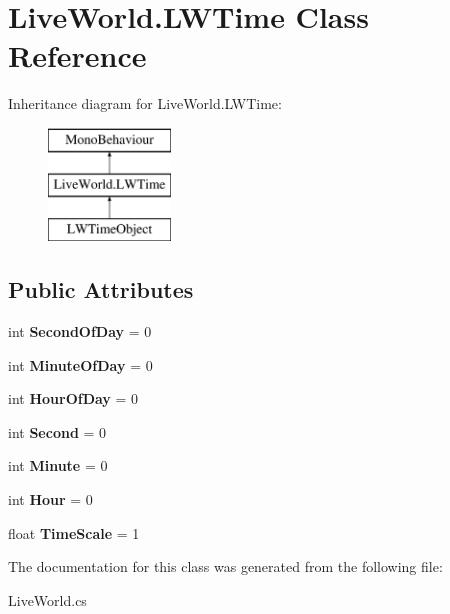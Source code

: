 \hypertarget{class_live_world_1_1_l_w_time}{}\section{Live\+World.\+L\+W\+Time Class Reference}
\label{class_live_world_1_1_l_w_time}
Inheritance diagram for Live\+World.\+L\+W\+Time\+:\begin{figure}[H]
\begin{center}
\leavevmode
\includegraphics[height=3.000000cm]{class_live_world_1_1_l_w_time}
\end{center}
\end{figure}
\subsection*{Public Attributes}
\begin{DoxyCompactItemize}
\item 
\hypertarget{class_live_world_1_1_l_w_time_a8d34fd904c42f1ecabc1ef56a560e4a5}{}int {\bfseries Second\+Of\+Day} = 0\label{class_live_world_1_1_l_w_time_a8d34fd904c42f1ecabc1ef56a560e4a5}

\item 
\hypertarget{class_live_world_1_1_l_w_time_ad98c462129085b115e646f54fc00e02a}{}int {\bfseries Minute\+Of\+Day} = 0\label{class_live_world_1_1_l_w_time_ad98c462129085b115e646f54fc00e02a}

\item 
\hypertarget{class_live_world_1_1_l_w_time_a0de710b75ac263ad18b1f29a08181a91}{}int {\bfseries Hour\+Of\+Day} = 0\label{class_live_world_1_1_l_w_time_a0de710b75ac263ad18b1f29a08181a91}

\item 
\hypertarget{class_live_world_1_1_l_w_time_a8eb13f9a24d15d4297d221f3514db522}{}int {\bfseries Second} = 0\label{class_live_world_1_1_l_w_time_a8eb13f9a24d15d4297d221f3514db522}

\item 
\hypertarget{class_live_world_1_1_l_w_time_a641bdc102974f7291351b7ec4ffe2215}{}int {\bfseries Minute} = 0\label{class_live_world_1_1_l_w_time_a641bdc102974f7291351b7ec4ffe2215}

\item 
\hypertarget{class_live_world_1_1_l_w_time_a86de8ebc20aae2050bdbac635686c86e}{}int {\bfseries Hour} = 0\label{class_live_world_1_1_l_w_time_a86de8ebc20aae2050bdbac635686c86e}

\item 
\hypertarget{class_live_world_1_1_l_w_time_abfcab60bb58e3fcdb3e5490cbf2fec95}{}float {\bfseries Time\+Scale} = 1\label{class_live_world_1_1_l_w_time_abfcab60bb58e3fcdb3e5490cbf2fec95}

\end{DoxyCompactItemize}


The documentation for this class was generated from the following file\+:\begin{DoxyCompactItemize}
\item 
Live\+World.\+cs\end{DoxyCompactItemize}
